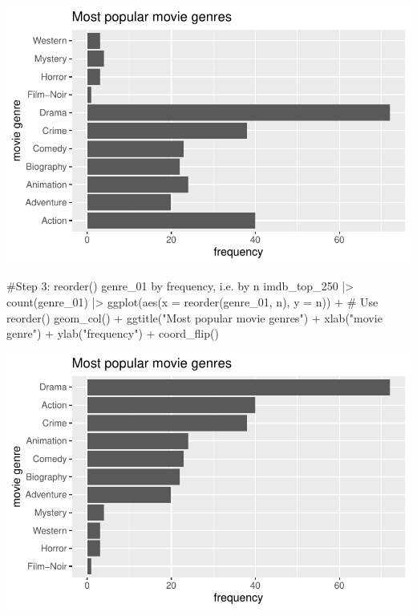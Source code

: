 \documentclass[
  letterpaper,
]{krantz}
\makeatletter
\newenvironment{Shaded}{\begin{snugshade}}{\end{snugshade}}
\newcommand{\AttributeTok}[1]{\textcolor[rgb]{0.40,0.45,0.13}{#1}}
\newcommand{\CommentTok}[1]{\textcolor[rgb]{0.37,0.37,0.37}{#1}}
\newcommand{\FunctionTok}[1]{\textcolor[rgb]{0.28,0.35,0.67}{#1}}
\newcommand{\NormalTok}[1]{\textcolor[rgb]{0.00,0.23,0.31}{#1}}
\newcommand{\SpecialCharTok}[1]{\textcolor[rgb]{0.37,0.37,0.37}{#1}}
\newcommand{\StringTok}[1]{\textcolor[rgb]{0.13,0.47,0.30}{#1}}
\newenvironment{kframe}{%
\medskip{}
\setlength{\fboxsep}{.8em}
 \def\at@end@of@kframe{}%
 \ifinner\ifhmode%
  \def\at@end@of@kframe{\end{minipage}}%
  \begin{minipage}{\columnwidth}%
 \fi\fi%
 \def\FrameCommand##1{\hskip\@totalleftmargin \hskip-\fboxsep
 \colorbox{shadecolor}{##1}\hskip-\fboxsep
     \hskip-\linewidth \hskip-\@totalleftmargin \hskip\columnwidth}%
 \MakeFramed {\advance\hsize-\width
   \@totalleftmargin\z@ \linewidth\hsize
   \@setminipage}}%
 {\par\unskip\endMakeFramed%
 \at@end@of@kframe}
\renewenvironment{Shaded}{\begin{kframe}}{\end{kframe}}
\makeatother
\begin{document}
\includegraphics{08_descriptive_statistics_files/figure-pdf/popular-genre-barplot-step-two-1.pdf}

\begin{Shaded}
\begin{Highlighting}[]
\CommentTok{\#Step 3: reorder() genre\_01 by frequency, i.e. by \textquotesingle{}n\textquotesingle{}}
\NormalTok{imdb\_top\_250 }\SpecialCharTok{|\textgreater{}}
  \FunctionTok{count}\NormalTok{(genre\_01) }\SpecialCharTok{|\textgreater{}}
  \FunctionTok{ggplot}\NormalTok{(}\FunctionTok{aes}\NormalTok{(}\AttributeTok{x =} \FunctionTok{reorder}\NormalTok{(genre\_01, n), }\AttributeTok{y =}\NormalTok{ n)) }\SpecialCharTok{+}  \CommentTok{\# Use \textquotesingle{}reorder()\textquotesingle{}}
  \FunctionTok{geom\_col}\NormalTok{() }\SpecialCharTok{+}
  \FunctionTok{ggtitle}\NormalTok{(}\StringTok{"Most popular movie genres"}\NormalTok{) }\SpecialCharTok{+}
  \FunctionTok{xlab}\NormalTok{(}\StringTok{"movie genre"}\NormalTok{) }\SpecialCharTok{+}
  \FunctionTok{ylab}\NormalTok{(}\StringTok{"frequency"}\NormalTok{) }\SpecialCharTok{+}
  \FunctionTok{coord\_flip}\NormalTok{()}
\end{Highlighting}
\end{Shaded}

\includegraphics{08_descriptive_statistics_files/figure-pdf/popular-genre-barplot-step-three-1.pdf}
\end{document}

